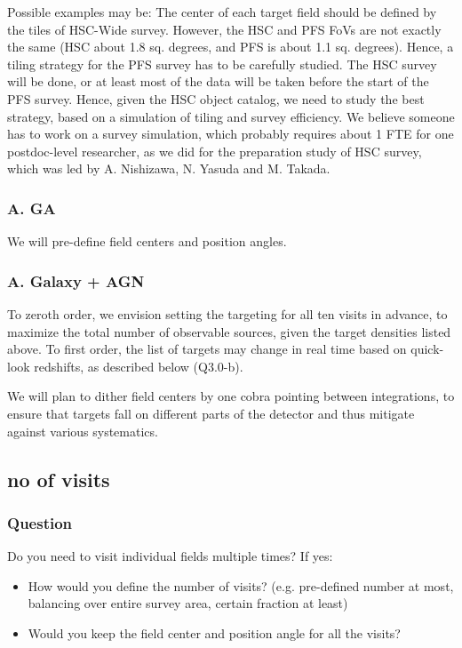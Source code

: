 \documentclass[a4paper,notitlepage]{article}
\begin{document}
Possible examples may be: The center of each target field should be
defined by the tiles of HSC-Wide survey.  However, the HSC and PFS
FoVs are not exactly the same (HSC about 1.8 sq. degrees, and PFS is
about 1.1 sq. degrees). Hence, a tiling strategy for the PFS survey
has to be carefully studied. The HSC survey will be done, or at least
most of the data will be taken before the start of the PFS
survey. Hence, given the HSC object catalog, we need to study the best
strategy, based on a simulation of tiling and survey efficiency.  We
believe someone has to work on a survey simulation, which probably
requires about 1 FTE for one postdoc-level researcher, as we did for
the preparation study of HSC survey, which was led by A. Nishizawa,
N. Yasuda and M. Takada.


\subsubsection{A. GA}
We will pre-define field centers and position angles.

\subsubsection{A. Galaxy + AGN}

To zeroth order, we envision setting the targeting for all ten visits in 
advance, to maximize the total number of observable sources, given 
the target densities listed above.  To first order, the list of targets 
may change in real time based on quick-look redshifts, as described 
below (Q3.0-b).

We will plan to dither field centers by one cobra pointing between 
integrations, to ensure that targets fall on different parts of 
the detector and thus mitigate against various systematics.


\subsection{no of visits}
\subsubsection{Question}
Do you need to visit individual fields multiple times?
          If yes:
          \begin{itemize}
           \item How would you define the number of visits? 
             (e.g. pre-defined number at most, balancing over entire survey 
             area, certain fraction at least) 
           \item Would you keep the field center and position angle
             for all the visits?
          \end{itemize}
\end{document}
